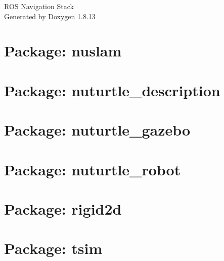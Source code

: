 \documentclass[twoside]{book}
\newcommand{\+}{\discretionary{\mbox{\scriptsize$\hookleftarrow$}}{}{}}
\newcommand{\clearemptydoublepage}{%
  \newpage{\pagestyle{empty}\cleardoublepage}%
}
\begin{document}
\hypersetup{pageanchor=false,
             bookmarksnumbered=true,
             pdfencoding=unicode
            }
\begin{titlepage}
\vspace*{7cm}
\begin{center}%
{\Large R\+OS Navigation Stack }\\
\vspace*{1cm}
{\large Generated by Doxygen 1.8.13}\\
\end{center}
\end{titlepage}
\clearemptydoublepage
{}
\tableofcontents
\clearemptydoublepage
{}
\hypersetup{pageanchor=true}

\chapter{Package\+: nuslam}
\label{md_nuslam_README}

\chapter{Package\+: nuturtle\+\_\+description}
\label{md_nuturtle_description_README}

\chapter{Package\+: nuturtle\+\_\+gazebo}
\label{md_nuturtle_gazebo_README}

\chapter{Package\+: nuturtle\+\_\+robot}
\label{md_nuturtle_robot_README}

\chapter{Package\+: rigid2d}
\label{md_rigid2d_README}

\chapter{Package\+: tsim}
\label{md_tsim_README}

\end{document}
